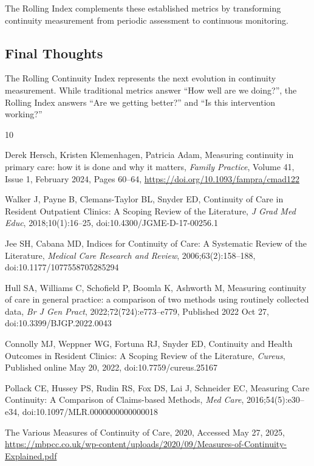 \documentclass[11pt,a4paper]{article}
\begin{document}
The Rolling Index complements these established metrics by transforming continuity measurement from periodic assessment to continuous monitoring. 

\subsection{Final Thoughts}

The Rolling Continuity Index represents the next evolution in continuity measurement. While traditional metrics answer ``How well are we doing?'', the Rolling Index answers ``Are we getting better?'' and ``Is this intervention working?''



\begin{thebibliography}{10}

Derek Hersch, Kristen Klemenhagen, Patricia Adam,
Measuring continuity in primary care: how it is done and why it matters,
\textit{Family Practice}, Volume 41, Issue 1, February 2024, Pages 60--64,
\url{https://doi.org/10.1093/fampra/cmad122}

Walker J, Payne B, Clemans-Taylor BL, Snyder ED,
Continuity of Care in Resident Outpatient Clinics: A Scoping Review of the Literature,
\textit{J Grad Med Educ}, 2018;10(1):16--25,
doi:10.4300/JGME-D-17-00256.1

Jee SH, Cabana MD,
Indices for Continuity of Care: A Systematic Review of the Literature,
\textit{Medical Care Research and Review}, 2006;63(2):158--188,
doi:10.1177/1077558705285294

Hull SA, Williams C, Schofield P, Boomla K, Ashworth M,
Measuring continuity of care in general practice: a comparison of two methods using routinely collected data,
\textit{Br J Gen Pract}, 2022;72(724):e773--e779,
Published 2022 Oct 27, doi:10.3399/BJGP.2022.0043

Connolly MJ, Weppner WG, Fortuna RJ, Snyder ED,
Continuity and Health Outcomes in Resident Clinics: A Scoping Review of the Literature,
\textit{Cureus}, Published online May 20, 2022,
doi:10.7759/cureus.25167

Pollack CE, Hussey PS, Rudin RS, Fox DS, Lai J, Schneider EC,
Measuring Care Continuity: A Comparison of Claims-based Methods,
\textit{Med Care}, 2016;54(5):e30--e34,
doi:10.1097/MLR.0000000000000018

The Various Measures of Continuity of Care,
2020, Accessed May 27, 2025,
\url{https://mbpcc.co.uk/wp-content/uploads/2020/09/Measures-of-Continuity-Explained.pdf}


\end{thebibliography}
\end{document}
